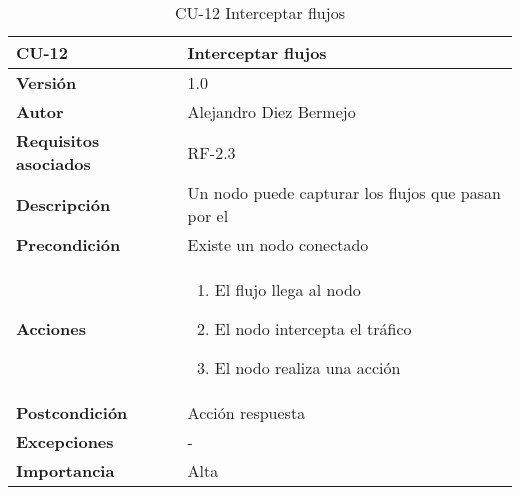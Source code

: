 \begin{table}[p]
	\centering
	\begin{tabularx}{\linewidth}{ p{} p{} }
		\toprule
		\textbf{CU-12}    & \textbf{Interceptar flujos}\\
		\toprule
		\textbf{Versión}              & 1.0    \\
		\textbf{Autor}                & Alejandro Diez Bermejo \\
		\textbf{Requisitos asociados} & RF-2.3 \\
		\textbf{Descripción}          & Un nodo puede capturar los flujos que pasan por el \\
        \textbf{Precondición}         & Existe un nodo conectado \\
		\textbf{Acciones}             &
		\begin{enumerate}
			\def\labelenumi{\arabic{enumi}.}
			\tightlist
			\item El flujo llega al nodo
            \item El nodo intercepta el tráfico
            \item El nodo realiza una acción
        \end{enumerate}\\
		\textbf{Postcondición}        & Acción respuesta \\
		\textbf{Excepciones}          & - \\
		\textbf{Importancia}          & Alta \\
		\bottomrule
	\end{tabularx}
	\caption{CU-12 Interceptar flujos}
\end{table}

